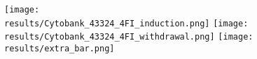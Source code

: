 \documentclass{article}
\begin{document}
\newcommand{\results}{../../real/analysis/pics}

\begin{figure}[bt]
\begin{center}
    \texttt{[image: \\results/Cytobank\_43324\_4FI\_induction.png]}
    \texttt{[image: \\results/Cytobank\_43324\_4FI\_withdrawal.png]}
    \texttt{[image: \\results/extra\_bar.png]}
\end{center}
\end{figure}
\end{document}
